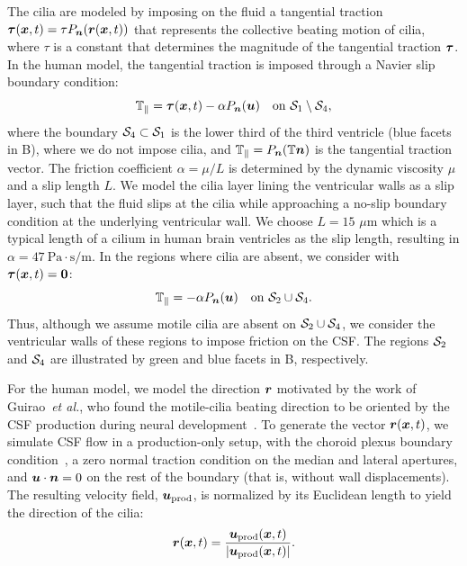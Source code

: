 \documentclass{template}
\begin{document}
The cilia are modeled by imposing on the fluid a
tangential traction $\bm{\tau}(\bm{x}, t) = \tau P_{\bm{n}}(\bm{r}(\bm{x}, t))$
that represents the collective beating motion of cilia,
where $\tau$ is a constant that determines the 
magnitude of the tangential traction $\bm{\tau}$.
In the human model, the tangential traction is
imposed through a Navier slip boundary condition:
\begin{equation}
    \mathbb{T}_{\parallel} = \bm{\tau}(\bm{x}, t) - \alpha P_{\bm{n}}(\bm{u})
    \quad\text{on }\mathcal{S}_1\setminus\mathcal{S}_4,
    \label{eq:cilia_navier_slip_bc}
\end{equation}
where the boundary $\mathcal{S}_4\subset\mathcal{S}_1$ is the lower third of
the third ventricle (blue facets in B),
where we do not impose cilia, and
$\mathbb{T}_{\parallel} = P_{\bm{n}}(\mathbb{T}\bm{n})$ is the
tangential traction vector. The friction coefficient $\alpha=\mu/L$ 
is determined by the dynamic viscosity $\mu$ and a slip length $L$.
We model the cilia layer lining the ventricular walls
as a slip layer, such that the fluid slips at the cilia while
approaching a no-slip boundary condition at the underlying
ventricular wall. We choose $L=15$ $\mu$m
which is a typical length of a cilium in human brain ventricles
\citep{Siyahhan2014FlowVentricles,Afzelius2004CiliaRelatedDiseases}
as the slip length, resulting in $\alpha=47 \ \mathrm{Pa\cdot s/m}$.
In the regions where cilia are absent, we consider
 with $\bm{\tau}(\bm{x}, t) = \bm{0}$:
\begin{equation}
    \mathbb{T}_{\parallel} = - \alpha P_{\bm{n}}(\bm{u})
    \quad\text{on }\mathcal{S}_2\cup\mathcal{S}_4.
    \label{eq:navier_slip_bc}
\end{equation}
Thus, although we assume motile cilia are absent on $\mathcal{S}_2\cup\mathcal{S}_4$,
we consider the ventricular walls of these regions to impose friction on the CSF.
The regions $\mathcal{S}_2$ and $\mathcal{S}_4$ are illustrated by
green and blue facets in B, respectively.

For the human model, we model the direction $\bm{r}$
motivated by the work of Guirao~\emph{et al.},
who found the motile-cilia beating direction to be oriented by the
CSF production during neural development~\citep{Guirao2010CouplingCilia}.
To generate the vector $\bm{r}(\bm{x}, t)$, we simulate CSF flow in a production-only
setup, with the choroid plexus boundary condition~,
a zero normal traction condition on the median and lateral apertures,
and $\bm{u}\cdot\bm{n}=0$ on the rest of the boundary (that is, without wall displacements). 
The resulting velocity field,
$\bm{u}_{\mathrm{prod}}$, is normalized by its Euclidean length
to yield the direction of the cilia:
\begin{equation*}
    \bm{r}(\bm{x}, t) = \frac{\bm{u}_{\mathrm{prod}}(\bm{x}, t)}{|\bm{u}_{\mathrm{prod}}(\bm{x}, t)|}.
\end{equation*}
\end{document}
